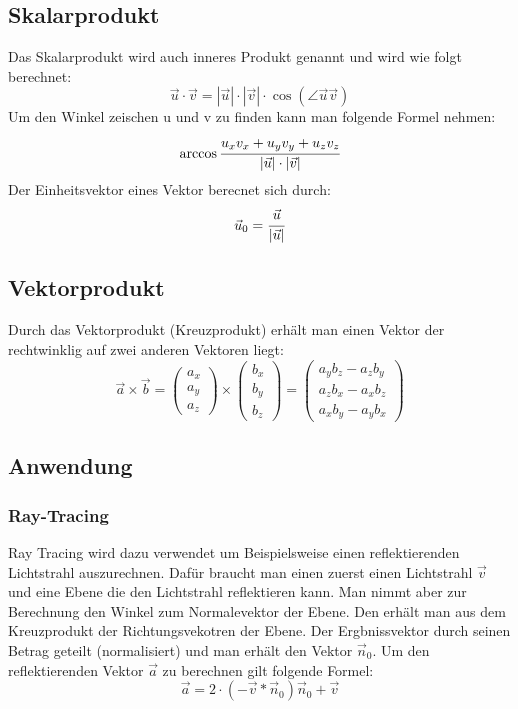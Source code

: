 \documentclass[a4paper,10pt]{scrartcl}
\begin{document}
        \subsection{Skalarprodukt}
            Das Skalarprodukt wird auch inneres Produkt genannt und wird wie folgt berechnet: 
            \[\vec{u} \cdot \vec{v} = |\vec{u}| \cdot |\vec{v}| \cdot \cos(\angle \vec{u} \vec{v})\]
            Um den Winkel zeischen u und v zu finden kann man folgende Formel nehmen: \[\arccos \cfrac{u_xv_x + u_yv_y + u_zv_z}{|\vec{u}|\cdot|\vec{v}|}\]
            Der Einheitsvektor eines Vektor berecnet sich durch:  \[\vec{u}_0 = \cfrac{\vec{u}}{|\vec{u}|}\]
        \subsection{Vektorprodukt}
            Durch das Vektorprodukt (Kreuzprodukt) erhält man einen Vektor der rechtwinklig auf zwei anderen Vektoren liegt:
            \[
                \vec{a} \times \vec{b} 
                =
                \begin{pmatrix}
                    a_x\\
                    a_y\\
                    a_z
                \end{pmatrix} \times
                \begin{pmatrix}
                    b_x\\
                    b_y\\
                    b_z
                \end{pmatrix}
                = 
                \begin{pmatrix}
                    a_yb_z - a_zb_y\\
                    a_zb_x - a_xb_z\\
                    a_xb_y - a_yb_x
                \end{pmatrix} 
            \]
        \subsection{Anwendung}
            \subsubsection{Ray-Tracing}
                Ray Tracing wird dazu verwendet um Beispielsweise einen reflektierenden Lichtstrahl auszurechnen. Dafür braucht man einen zuerst einen Lichtstrahl $\vec{v}$ und eine Ebene die den 
                Lichtstrahl reflektieren kann.  Man nimmt aber zur Berechnung den Winkel zum Normalevektor der Ebene. Den erhält man aus dem Kreuzprodukt der Richtungsvekotren der Ebene. 
                Der Ergbnissvektor durch seinen Betrag geteilt (normalisiert) und man erhält den Vektor $\vec{n}_0$. Um den reflektierenden Vektor $\vec{a}$ zu berechnen gilt folgende Formel:
                \[
                    \vec{a} = 2 \cdot (-\vec{v} * \vec{n}_0) \vec{n}_0 + \vec{v}
                \]   
\end{document}
